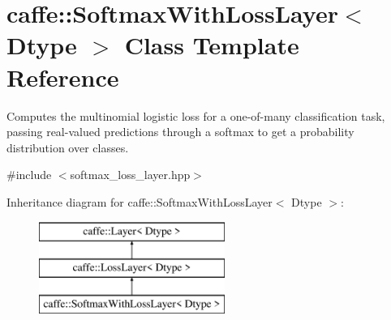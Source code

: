 \hypertarget{classcaffe_1_1SoftmaxWithLossLayer}{}\section{caffe\+:\+:Softmax\+With\+Loss\+Layer$<$ Dtype $>$ Class Template Reference}
\label{classcaffe_1_1SoftmaxWithLossLayer}


Computes the multinomial logistic loss for a one-\/of-\/many classification task, passing real-\/valued predictions through a softmax to get a probability distribution over classes.  




{\ttfamily \#include $<$softmax\+\_\+loss\+\_\+layer.\+hpp$>$}

Inheritance diagram for caffe\+:\+:Softmax\+With\+Loss\+Layer$<$ Dtype $>$\+:\begin{figure}[H]
\begin{center}
\leavevmode
\includegraphics[height=3.000000cm]{classcaffe_1_1SoftmaxWithLossLayer}
\end{center}
\end{figure}
